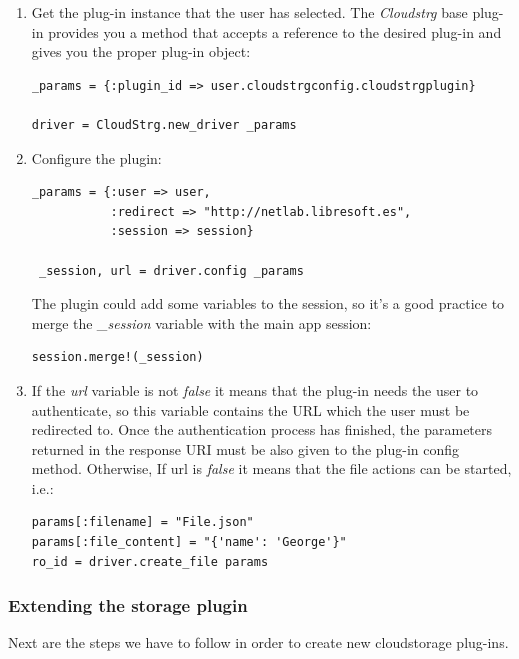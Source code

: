 \documentclass{article}
\begin{document}
\begin{enumerate}
\item Get the plug-in instance that the user has selected. The \textit{Cloudstrg} base plug-in provides you a method that accepts a reference to the desired plug-in and gives you the proper plug-in object:
\begin{verbatim}
_params = {:plugin_id => user.cloudstrgconfig.cloudstrgplugin}

driver = CloudStrg.new_driver _params
\end{verbatim}

\item Configure the plugin:
\begin{verbatim}
_params = {:user => user,
           :redirect => "http://netlab.libresoft.es",
           :session => session}

 _session, url = driver.config _params
\end{verbatim}

The plugin could add some variables to the session, so it's a good practice to merge the \textit{\_session} variable with the main app session:
\begin{verbatim}
session.merge!(_session)
\end{verbatim}

\item If the \textit{url} variable is not \textit{false} it means that the plug-in needs the user to authenticate, so this variable contains the URL which the user must be redirected to. Once the authentication process has finished, the parameters returned in the response URI must be also given to the plug-in config method. Otherwise, If url is \textit{false} it means that the file actions can be started, i.e.:
\begin{verbatim}
params[:filename] = "File.json"
params[:file_content] = "{'name': 'George'}"
ro_id = driver.create_file params
\end{verbatim}
\end{enumerate}

\subsubsection{Extending the storage plugin}
Next are the steps we have to follow in order to create new cloudstorage plug-ins.
\end{document}
